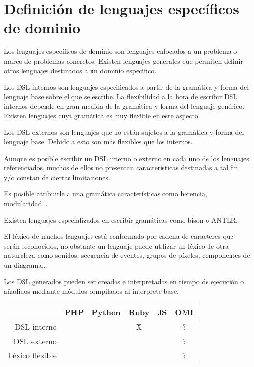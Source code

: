 \section{Definición de lenguajes específicos de dominio}
Los lenguajes específicos de dominio son lenguajes enfocados a un problema
o marco de problemas concretos. Existen lenguajes generales que permiten definir 
otros lenguajes destinados a un dominio específico. 

Los DSL internos son lenguajes especificados a partir de la gramática y forma del
lenguaje base sobre el que se escribe. La flexibilidad a la hora de escribir DSL internos depende en 
gran medida de la gramática y forma del lenguaje genérico. Existen lenguajes cuya 
gramática es muy flexible en este aspecto.

Los DSL externos son lenguajes que no están sujetos a la gramática y forma del 
lenguaje base. Debido a esto son más flexibles que los internos.

Aunque es posible escribir un DSL interno o externo en cada uno de los lenguajes referenciados,
muchos de ellos no presentan características destinadas a tal fin y/o constan de ciertas limitaciones.

Es posible atribuirle a una gramática características como herencia, modularidad...

Existen lenguajes especializados en escribir gramáticas como bison o ANTLR.

El léxico de muchos lenguajes está conformado por cadena de caracteres que serán reconocidos,
no obstante un lenguaje puede utilizar un léxico de otra naturaleza como sonidos,
secuencia de eventos, grupos de píxeles, componentes de un diagrama...

Los DSL generados pueden ser creados e interpretados en tiempo de ejecución o añadidos
mediante módulos compilados al interprete base.

\FloatBarrier
\begin{table}[h]
\begin{center}
 
\begin{tabular}{|r|c|c|c|c|c|} \hline
 & PHP  & Python & Ruby & JS & OMI\\ \hline
DSL interno &  &  &  X &   & ? \\ \hline
DSL externo &  &  &  &  & ? \\ \hline
Léxico flexible &  &  &  &  & ? \\ \hline
\end{tabular}
\end{center}
\end{table}
\FloatBarrier


